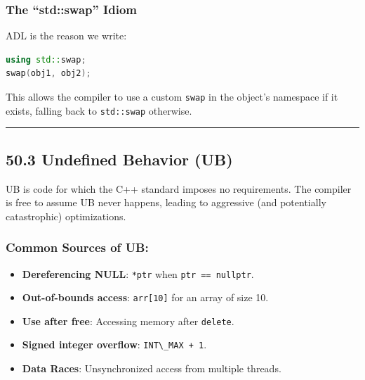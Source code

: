 \hypertarget{the-stdswap-idiom}{%
\subsubsection{The ``std::swap'' Idiom}\label{the-stdswap-idiom}}

ADL is the reason we write:

\begin{lstlisting}[language={C++}]
using std::swap;
swap(obj1, obj2);
\end{lstlisting}

This allows the compiler to use a custom \passthrough{\lstinline!swap!}
in the object's namespace if it exists, falling back to
\passthrough{\lstinline!std::swap!} otherwise.

\begin{center}\rule{0.5\linewidth}{0.5pt}\end{center}

\hypertarget{undefined-behavior-ub}{%
\subsection{50.3 Undefined Behavior (UB)}\label{undefined-behavior-ub}}

UB is code for which the C++ standard imposes no requirements. The
compiler is free to assume UB never happens, leading to aggressive (and
potentially catastrophic) optimizations.

\hypertarget{common-sources-of-ub}{%
\subsubsection{Common Sources of UB:}\label{common-sources-of-ub}}

\begin{itemize}
\tightlist
\item
  \textbf{Dereferencing NULL}: \passthrough{\lstinline!*ptr!} when
  \passthrough{\lstinline!ptr == nullptr!}.
\item
  \textbf{Out-of-bounds access}: \passthrough{\lstinline!arr[10]!} for
  an array of size 10.
\item
  \textbf{Use after free}: Accessing memory after
  \passthrough{\lstinline!delete!}.
\item
  \textbf{Signed integer overflow}:
  \passthrough{\lstinline!INT\_MAX + 1!}.
\item
  \textbf{Data Races}: Unsynchronized access from multiple threads.
\end{itemize}

